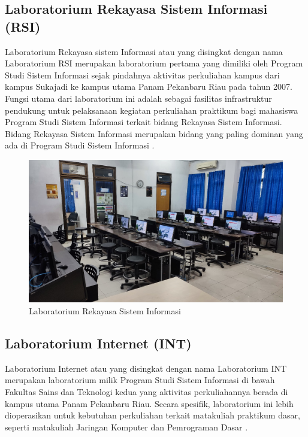 \subsection{Laboratorium Rekayasa Sistem Informasi (RSI)}
Laboratorium Rekayasa sistem Informasi atau yang disingkat dengan nama Laboratorium RSI merupakan laboratorium pertama yang dimiliki oleh Program Studi Sistem Informasi sejak pindahnya aktivitas perkuliahan kampus dari kampus Sukajadi ke kampus utama Panam Pekanbaru Riau pada tahun 2007. Fungsi utama dari laboratorium ini adalah sebagai fasilitas infrastruktur pendukung untuk pelaksanaan kegiatan perkuliahan praktikum bagi mahasiswa Program Studi Sistem Informasi terkait bidang Rekayasa Sistem Informasi. Bidang Rekayasa Sistem Informasi merupakan bidang yang paling dominan yang ada di Program Studi Sistem Informasi \cite{lab-si-website}.

\begin{figure}
	\centering
	\includegraphics[width=0.82\linewidth]{konten/gambar/lab-rsi.jpg}
	\caption{Laboratorium Rekayasa Sistem Informasi \protect\cite{labsi2023}}
	\label{fig:lab-rsi}
\end{figure}

\subsection{Laboratorium Internet (INT)}
Laboratorium Internet atau yang disingkat dengan nama Laboratorium INT merupakan laboratorium milik Program Studi Sistem Informasi di bawah Fakultas Sains dan Teknologi kedua yang aktivitas perkuliahannya berada di kampus utama Panam Pekanbaru Riau. Secara spesifik, laboratorium ini lebih dioperasikan untuk kebutuhan perkuliahan terkait matakuliah praktikum dasar, seperti matakuliah Jaringan Komputer dan Pemrograman Dasar \cite{lab-si-website}.

